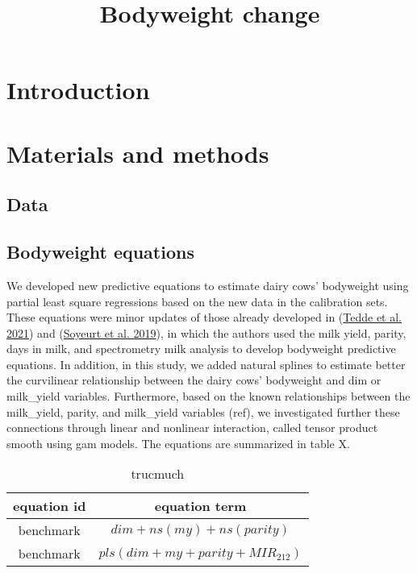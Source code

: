 \documentclass[
]{article}
\title{Bodyweight change}
\author{}
\date{\vspace{-2.5em}}
\begin{document}
\maketitle

\hypertarget{introduction}{%
\section{Introduction}\label{introduction}}

\hypertarget{materials-and-methods}{%
\section{Materials and methods}\label{materials-and-methods}}

\hypertarget{data}{%
\subsection{Data}\label{data}}

\hypertarget{bodyweight-equations}{%
\subsection{Bodyweight equations}\label{bodyweight-equations}}

We developed new predictive equations to estimate dairy cows' bodyweight
using partial least square regressions based on the new data in the
calibration sets. These equations were minor updates of those already
developed in (\protect\hyperlink{ref-tedde_validation_2021}{Tedde et al.
2021}) and (\protect\hyperlink{ref-soyeurt_contribution_2019}{Soyeurt et
al. 2019}), in which the authors used the milk yield, parity, days in
milk, and spectrometry milk analysis to develop bodyweight predictive
equations. In addition, in this study, we added natural splines to
estimate better the curvilinear relationship between the dairy cows'
bodyweight and dim or milk\_yield variables. Furthermore, based on the
known relationships between the milk\_yield, parity, and milk\_yield
variables (ref), we investigated further these connections through
linear and nonlinear interaction, called tensor product smooth using gam
models. The equations are summarized in table X.

\begin{table}
\begin{center}
\begin{tabular}{cc}
\hline
equation id & equation term \\
\hline
benchmark & $dim + ns(my) + ns(parity)$ \\
benchmark & $pls(dim + my + parity + MIR_212)$ \\
\hline
\end{tabular}
\caption{trucmuch}
\end{center}
\end{table}
\end{document}

